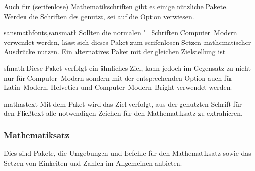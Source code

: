 %
Auch für (serifenlose) Mathematikschriften gibt es einige nützliche Pakete. 
Werden die Schriften des \CDs genutzt, sei auf die Option  
verwiesen.
%
\begin{packages}
%
\item[sansmathfonts,sansmath]
  Sollten die normalen "=Schriften Computer~Modern verwendet 
  werden, lässt sich dieses Paket zum serifenlosen Setzen mathematischer 
  Ausdrücke nutzen. Ein alternatives Paket mit der gleichen Zielstellung ist 
\item[sfmath]
  Diese Paket verfolgt ein ähnliches Ziel, kann jedoch im Gegensatz zu 
   nicht nur für Computer~Modern sondern mit der 
  entsprechenden Option auch für Latin~Modern, Helvetica und 
  Computer~Modern~Bright verwendet werden.
\item[mathastext]
  Mit dem Paket wird das Ziel verfolgt, aus der genutzten Schrift für den 
  Fließtext alle notwendigen Zeichen für den Mathematiksatz zu extrahieren.
\end{packages}

\subsubsection{Mathematiksatz}
Dies sind Pakete, die Umgebungen und Befehle für den Mathematiksatz sowie das 
Setzen von Einheiten und Zahlen im Allgemeinen anbieten.

